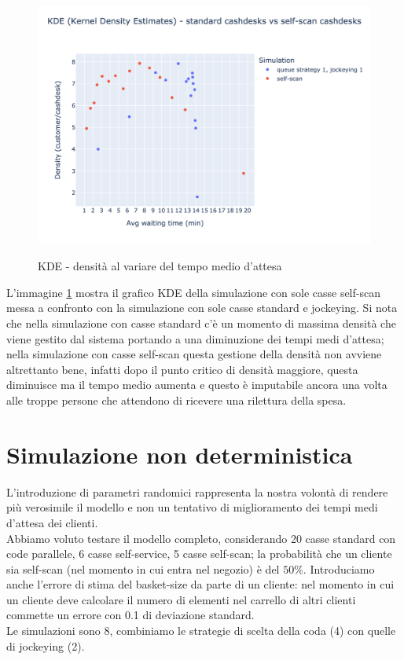 \begin{figure}[H]
	\centering
	\includegraphics[width=12cm]{"images/results/kde_self_scan.png"}
	\label{fig:kde_self_scan}
	\caption{KDE - densità al variare del tempo medio d'attesa}
\end{figure}

L'immagine \ref{fig:kde_self_scan} mostra il grafico KDE della
simulazione con sole casse self-scan messa a confronto con la
simulazione con sole casse standard e jockeying. Si nota che nella
simulazione con casse standard c'è un momento di massima densità che
viene gestito dal sistema portando a una diminuzione dei tempi medi
d'attesa; nella simulazione con casse self-scan questa gestione della
densità non avviene altrettanto bene, infatti dopo il punto critico di
densità maggiore, questa diminuisce ma il tempo medio aumenta e questo
è imputabile ancora una volta alle troppe persone che attendono di
ricevere una rilettura della spesa.

\section{Simulazione non deterministica}

L'introduzione di parametri randomici rappresenta la nostra volontà di rendere più verosimile il modello e non un tentativo di miglioramento dei tempi medi d'attesa dei clienti. \\
Abbiamo voluto testare il modello completo, considerando 20 casse standard con code parallele, 6 casse self-service, 5 casse self-scan; la probabilità che un cliente sia self-scan (nel momento in cui entra nel negozio) è del $50\%$. Introduciamo anche l'errore di stima del basket-size da parte di un cliente: nel momento in cui un cliente deve calcolare il numero di elementi nel carrello di altri clienti commette un errore con 0.1 di deviazione standard. \\
Le simulazioni sono 8, combiniamo le strategie di scelta della coda
(4) con quelle di jockeying (2).


